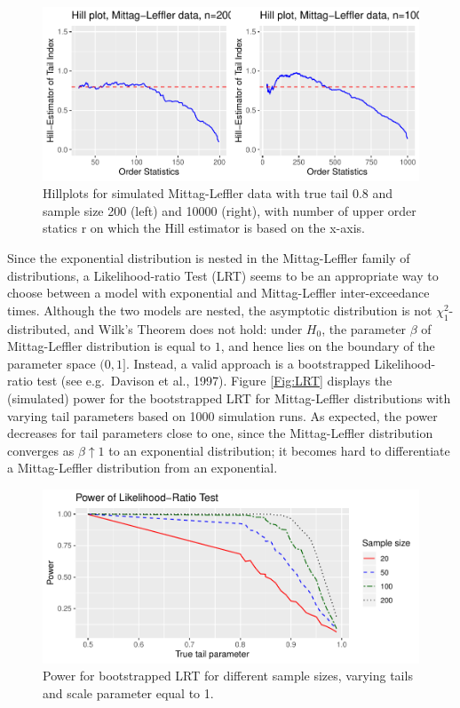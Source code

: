 \documentclass[]{elsarticle} %
\begin{document}
\begin{figure}

{\centering \includegraphics[width=0.9\linewidth]{article_springer_files/figure-latex/Hillplots-1} 

}

\caption{\label{fig:Hillplots} Hillplots for simulated Mittag-Leffler data with true tail 0.8 and sample size 200 (left) and 10000 (right), with number of upper order statics r on which the Hill estimator is based on the x-axis. }\label{fig:Hillplots}
\end{figure}

Since the exponential distribution is nested in the Mittag-Leffler
family of distributions, a Likelihood-ratio Test (LRT) seems to be an
appropriate way to choose between a model with exponential and
Mittag-Leffler inter-exceedance times. Although the two models are
nested, the asymptotic distribution is not \(\chi^2_1\)-distributed, and
Wilk's Theorem does not hold: under \(H_0\), the parameter \(\beta\) of
Mittag-Leffler distribution is equal to \(1\), and hence lies on the
boundary of the parameter space \((0,1]\). Instead, a valid approach is
a bootstrapped Likelihood-ratio test (see e.g.~Davison et al., 1997).
Figure \ref{Fig:LRT} displays the (simulated) power for the bootstrapped
LRT for Mittag-Leffler distributions with varying tail parameters based
on 1000 simulation runs. As expected, the power decreases for tail
parameters close to one, since the Mittag-Leffler distribution converges
as \(\beta \uparrow 1\) to an exponential distribution; it becomes hard
to differentiate a Mittag-Leffler distribution from an exponential.

\begin{figure}

{\centering \includegraphics[width=0.9\linewidth]{article_springer_files/figure-latex/LRT_power-1} 

}

\caption{\label{Fig:LRT} Power for bootstrapped LRT for different sample sizes, varying tails and scale parameter equal to 1.}\label{fig:LRT_power}
\end{figure}
\end{document}
